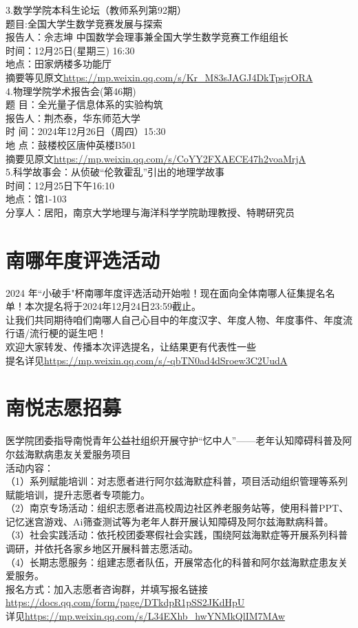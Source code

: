 \documentclass[letterpaper, 12pt]{article}
\begin{document}
\begin{multicols}{2}
3.数学学院本科生论坛（教师系列第92期）\\
题目:全国大学生数学竞赛发展与探索\\
报告人：佘志坤 中国数学会理事兼全国大学生数学竞赛工作组组长\\
时间：12月25日(星期三) 16:30\\
地点：田家炳楼多功能厅\\
摘要等见原文\url{https://mp.weixin.qq.com/s/Kr_M83sJAGJ4DkTpsjrORA}\\

4.物理学院学术报告会(第46期)\\
题   目：全光量子信息体系的实验构筑\\
报告人：荆杰泰，华东师范大学\\
时   间：2024年12月26日（周四）15:30\\
地   点：鼓楼校区唐仲英楼B501\\
摘要见原文\url{https://mp.weixin.qq.com/s/CoYY2FXAECE47h2voaMrjA}\\

5.科学故事会：从侦破“伦敦霍乱”引出的地理学故事\\
时间：12月25日下午16:10\\
地点：馆1-103\\
分享人：居阳，南京大学地理与海洋科学学院助理教授、特聘研究员\\

\section{南哪年度评选活动}
2024 年“小破手"杯南哪年度评选活动开始啦！现在面向全体南哪人征集提名名单！本次提名将于2024年12月24日23:59截止。\\
让我们共同期待咱们南哪人自己心目中的年度汉字、年度人物、年度事件、年度流行语/流行梗的诞生吧！\\
欢迎大家转发、传播本次评选提名，让结果更有代表性一些~\\
提名详见\url{https://mp.weixin.qq.com/s/-qbTN0ad4dSroew3C2UudA}

\section{南悦志愿招募}
医学院团委指导南悦青年公益社组织开展守护“忆中人”——老年认知障碍科普及阿尔兹海默病患友关爱服务项目\\
活动内容：\\
（1）系列赋能培训：对志愿者进行阿尔兹海默症科普，项目活动组织管理等系列赋能培训，提升志愿者专项能力。\\
（2）南京专场活动：组织志愿者进高校周边社区养老服务站等，使用科普PPT、记忆迷宫游戏、Ai筛查测试等为老年人群开展认知障碍及阿尔兹海默病科普。\\
（3）社会实践活动：依托校团委寒假社会实践，围绕阿兹海默症等开展系列科普调研，并依托各家乡地区开展科普志愿活动。\\
（4）长期志愿服务：组建志愿者队伍，开展常态化的科普和阿尔兹海默症患友关爱服务。\\
报名方式：加入志愿者咨询群，并填写报名链接\url{https://docs.qq.com/form/page/DTkdpR1pSS2JKdHpU}\\
详见\url{https://mp.weixin.qq.com/s/L34EXhb_hwYNMkQlIM7MAw}


\end{multicols}
\end{document}
